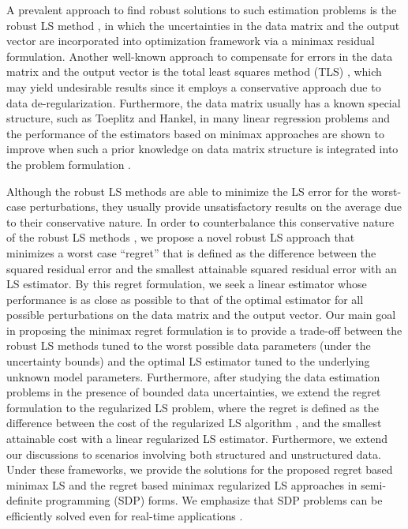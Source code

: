 \documentclass[review,sort&compress]{elsarticle}
\begin{document}
A prevalent approach to find robust solutions to such estimation problems is the robust LS method \cite{Ghaoui97, sayed02,kalantarova}, in which the uncertainties in the data matrix and the output vector are incorporated into optimization framework via a minimax residual formulation. Another well-known approach to compensate for errors in the data matrix and the output vector is the total least squares method (TLS) \cite{pilanci10}, which may yield undesirable results since it employs a conservative approach due to data de-regularization. Furthermore, the data matrix usually has a known special structure, such as Toeplitz and Hankel, in many linear regression problems \cite{Ghaoui97, pilanci10} and the performance of the estimators based on minimax approaches are shown to improve
when such a prior knowledge on data matrix structure is integrated into the problem formulation \cite{Ghaoui97, pilanci10}.

Although the robust LS methods are able to minimize the LS error for the worst-case perturbations, they usually provide unsatisfactory results on the average \cite{pilanci10,chandra1,chandra2,chandra3} due to their conservative nature. In order to counterbalance this conservative nature of the robust LS methods \cite{Ghaoui97}, we propose a novel robust LS approach that minimizes a worst case ``regret'' that is defined as the difference between the squared residual error and the smallest attainable squared residual error with an LS estimator. By this regret formulation, we seek a linear estimator whose performance is as close as possible to that of the optimal estimator for all possible perturbations on the data matrix and the output vector. Our main goal in proposing the minimax regret formulation is to provide a trade-off between the robust LS methods tuned to the worst possible data parameters (under the uncertainty bounds) and the optimal LS estimator tuned to the underlying unknown model parameters. Furthermore, after studying the data estimation problems in the presence of bounded data uncertainties, we extend the regret formulation to the regularized LS problem, where the regret is defined as the difference between the cost of the regularized LS algorithm \cite{Kailath:book, sayed02}, and the smallest attainable cost with a linear regularized LS estimator. Furthermore, we extend our discussions to scenarios involving both structured and unstructured data. Under these frameworks, we provide the solutions for the proposed regret based minimax LS and the regret based minimax regularized LS approaches in semi-definite programming (SDP) forms. We emphasize that SDP problems can be efficiently solved even for real-time applications \cite{boyd}.
\end{document}

